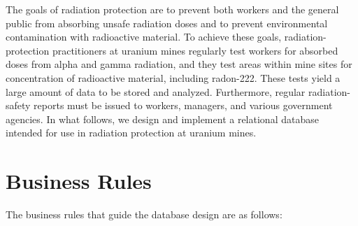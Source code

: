 \documentclass[12pt,a4paper]{article}
\begin{document}
The goals of radiation protection are to prevent both workers and the general public from absorbing unsafe radiation doses and to prevent environmental contamination with radioactive material. To achieve these goals, radiation-protection practitioners at uranium mines regularly test workers for absorbed doses from alpha and gamma radiation, and they test areas within mine sites for concentration of radioactive material, including radon-222. These tests yield a large amount of data to be stored and analyzed. Furthermore, regular radiation-safety reports must be issued to workers, managers, and various government agencies. In what follows, we design and implement a relational database intended for use in radiation protection at uranium mines.

\section{Business Rules}

The business rules that guide the database design are as follows:
\end{document}

